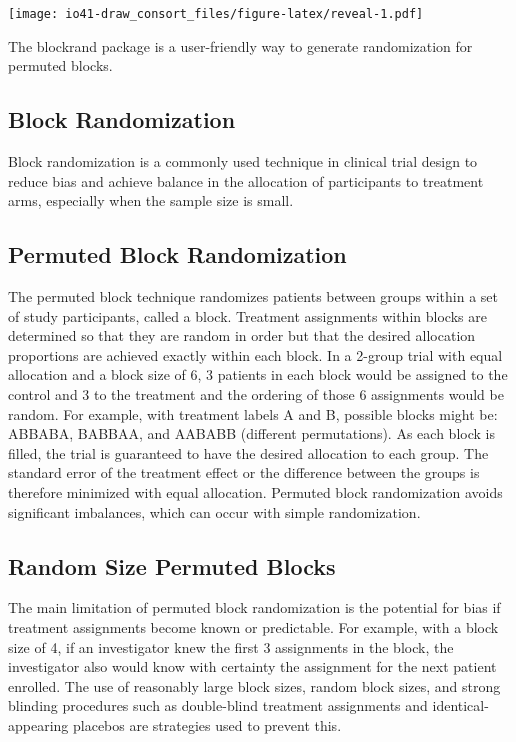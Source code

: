 \documentclass[
]{book}
\begin{document}
\texttt{[image: io41-draw\_consort\_files/figure-latex/reveal-1.pdf]}

The blockrand package is a user-friendly way to generate randomization for permuted blocks.

\hypertarget{block-randomization}{%
\subsection{Block Randomization}\label{block-randomization}}

Block randomization is a commonly used technique in clinical trial design to reduce bias and achieve balance in the allocation of participants to treatment arms, especially when the sample size is small.

\hypertarget{permuted-block-randomization}{%
\subsection{Permuted Block Randomization}\label{permuted-block-randomization}}

The permuted block technique randomizes patients between groups within a set of study participants, called a block. Treatment assignments within blocks are determined so that they are random in order but that the desired allocation proportions are achieved exactly within each block. In a 2-group trial with equal allocation and a block size of 6, 3 patients in each block would be assigned to the control and 3 to the treatment and the ordering of those 6 assignments would be random. For example, with treatment labels A and B, possible blocks might be: ABBABA, BABBAA, and AABABB (different permutations). As each block is filled, the trial is guaranteed to have the desired allocation to each group.
The standard error of the treatment effect or the difference between the groups is therefore minimized with equal allocation. Permuted block randomization avoids significant imbalances, which can occur with simple randomization.

\hypertarget{random-size-permuted-blocks}{%
\subsection{Random Size Permuted Blocks}\label{random-size-permuted-blocks}}

The main limitation of permuted block randomization is the potential for bias if treatment assignments become known or predictable. For example, with a block size of 4, if an investigator knew the first 3 assignments in the block, the investigator also would know with certainty the assignment for the next patient enrolled. The use of reasonably large block sizes, random block sizes, and strong blinding procedures such as double-blind treatment assignments and identical-appearing placebos are strategies used to prevent this.
\end{document}

